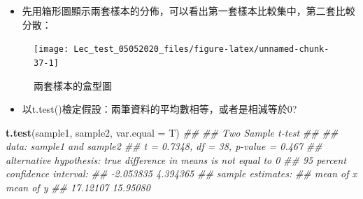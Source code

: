 \documentclass[hyperref,]{ctexart}
\newenvironment{Shaded}{\begin{snugshade}}{\end{snugshade}}
\newcommand{\CommentTok}[1]{\textcolor[rgb]{0.56,0.35,0.01}{\textit{#1}}}
\newcommand{\DataTypeTok}[1]{\textcolor[rgb]{0.13,0.29,0.53}{#1}}
\newcommand{\DecValTok}[1]{\textcolor[rgb]{0.00,0.00,0.81}{#1}}
\newcommand{\KeywordTok}[1]{\textcolor[rgb]{0.13,0.29,0.53}{\textbf{#1}}}
\newcommand{\NormalTok}[1]{#1}
\newcommand{\OperatorTok}[1]{\textcolor[rgb]{0.81,0.36,0.00}{\textbf{#1}}}
\newcommand{\StringTok}[1]{\textcolor[rgb]{0.31,0.60,0.02}{#1}}
\providecommand{\tightlist}{%
  \setlength{\itemsep}{0pt}\setlength{\parskip}{0pt}}
\begin{document}
\begin{itemize}
\tightlist
\item
  先用箱形圖顯示兩套樣本的分佈，可以看出第一套樣本比較集中，第二套比較分散：
\end{itemize}

\begin{Shaded}
\end{Shaded}

\begin{figure}

\texttt{[image: Lec\_test\_05052020\_files/figure-latex/unnamed-chunk-37-1]} \hfill{}

\caption{\label{fig:boxplot1}兩套樣本的盒型圖}\label{fig:unnamed-chunk-37}
\end{figure}

\begin{itemize}
\tightlist
\item
  以t.test()檢定假設：兩筆資料的平均數相等，或者是相減等於0?
\end{itemize}

\begin{Shaded}
\begin{Highlighting}[]
 \KeywordTok{t.test}\NormalTok{(sample1, sample2, }\DataTypeTok{var.equal =}\NormalTok{ T)}
\CommentTok{## }
\CommentTok{##  Two Sample t-test}
\CommentTok{## }
\CommentTok{## data:  sample1 and sample2}
\CommentTok{## t = 0.7348, df = 38, p-value = 0.467}
\CommentTok{## alternative hypothesis: true difference in means is not equal to 0}
\CommentTok{## 95 percent confidence interval:}
\CommentTok{##  -2.053835  4.394365}
\CommentTok{## sample estimates:}
\CommentTok{## mean of x mean of y }
\CommentTok{##  17.12107  15.95080}
\end{Highlighting}
\end{Shaded}
\end{document}
